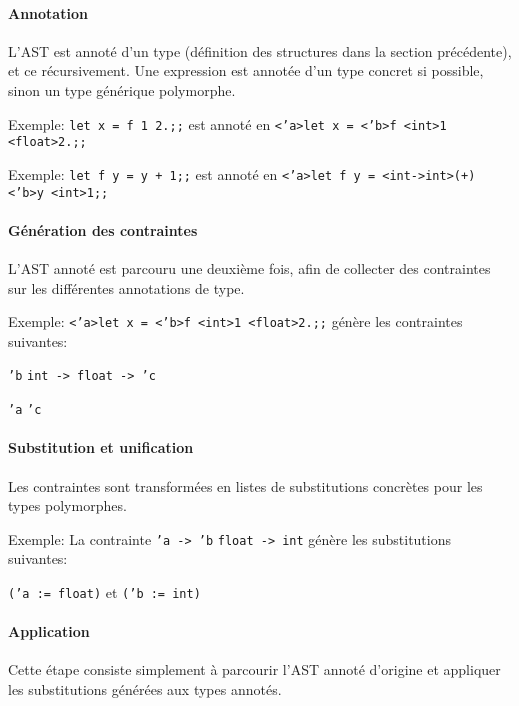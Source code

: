\documentclass[paper=a4, fontsize=11pt]{scrartcl}
\numberwithin{equation}{section}		%
\numberwithin{figure}{section}			%
\numberwithin{table}{section}				%
\begin{document}
\paragraph{Annotation}
L'AST est annoté d'un type (définition des structures dans la section précédente), et ce récursivement.
Une expression est annotée d'un type concret si possible, sinon un type générique polymorphe.

\begin{small}
    Exemple: \texttt{let x = f 1 2.;;} est annoté en \texttt{<'a>let x = <'b>f <int>1 <float>2.;;}
    
    Exemple: \texttt{let f y = y + 1;;} est annoté en \texttt{<'a>let f y = <int->int>(+) <'b>y <int>1;;}
\end{small}

\paragraph{Génération des contraintes}
L'AST annoté est parcouru une deuxième fois, afin de collecter des contraintes sur les différentes annotations de type.

\begin{small}
    Exemple: \texttt{<'a>let x = <'b>f <int>1 <float>2.;;} génère les contraintes suivantes:
   
    \texttt{'b} \Longleftrightarrow \texttt{int -> float -> 'c}
    
    \texttt{'a} \Longleftrightarrow \texttt{'c}
\end{small}

\paragraph{Substitution et unification}
Les contraintes sont transformées en listes de substitutions concrètes pour les types polymorphes.

\begin{small}
    Exemple: La contrainte \texttt{'a -> 'b} \Longleftrightarrow \texttt{float -> int} génère les substitutions suivantes:

    \texttt{('a := float)} et \texttt{('b := int)}
\end{small}

\paragraph{Application}
Cette étape consiste simplement à parcourir l'AST annoté d'origine et appliquer les substitutions générées aux types annotés.
\end{document}
